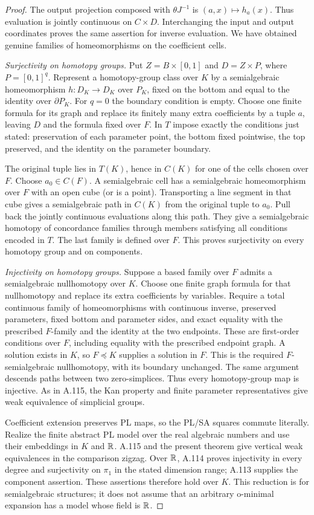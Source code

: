\begin{proof}
The output projection composed with $\theta J^{-1}$ is
$(a,x)\mapsto h_a(x)$. Thus evaluation is jointly continuous on
$C\times D$. Interchanging the input and output coordinates
proves the same assertion for inverse evaluation. We have
obtained genuine families of homeomorphisms on the coefficient
cells.

\emph{Surjectivity on homotopy groups.}
Put $Z=B\times[0,1]$ and $D=Z\times P$, where $P=[0,1]^q$.
Represent a homotopy-group class over $K$ by a semialgebraic
homeomorphism $h:D_K\to D_K$ over $P_K$, fixed on the bottom
and equal to the identity over $\partial P_K$. For $q=0$ the
boundary condition is empty. Choose one finite formula for its
graph and replace its finitely many extra coefficients by a
tuple $a$, leaving $D$ and the formula fixed over $F$. In $T$
impose exactly the conditions just stated: preservation of each
parameter point, the bottom fixed pointwise, the top preserved,
and the identity on the parameter boundary.

The original tuple lies in $T(K)$, hence in $C(K)$ for one of
the cells chosen over $F$. Choose $a_0\in C(F)$. A semialgebraic
cell has a semialgebraic homeomorphism over $F$ with an open
cube (or is a point). Transporting a line segment in that cube
gives a semialgebraic path in $C(K)$ from the original tuple to
$a_0$. Pull back the jointly continuous evaluations along this
path. They give a semialgebraic homotopy of concordance families
through members satisfying all conditions encoded in $T$.
The last family is defined over $F$. This proves surjectivity
on every homotopy group and on components.

\emph{Injectivity on homotopy groups.}
Suppose a based family over $F$ admits a semialgebraic
nullhomotopy over $K$. Choose one finite graph formula for that
nullhomotopy and replace its extra coefficients by variables.
Require a total continuous family of homeomorphisms with
continuous inverse, preserved parameters, fixed bottom and
parameter sides, and exact equality with the prescribed
$F$-family and the identity at the two endpoints. These are
first-order conditions over $F$, including equality with the
prescribed endpoint graph. A solution exists in $K$, so
$F\preccurlyeq K$ supplies a solution in $F$. This is the
required $F$-semialgebraic nullhomotopy, with its boundary
unchanged. The same argument descends paths between two
zero-simplices. Thus every homotopy-group map is injective.
As in A.115, the Kan property and finite parameter
representatives give weak equivalence of simplicial groups.

Coefficient extension preserves PL maps, so the PL/SA squares
commute literally. Realize the finite abstract PL model over
the real algebraic numbers and use their embeddings in $K$
and $\mathbb R$. A.115 and the present theorem give vertical weak
equivalences in the comparison zigzag. Over $\mathbb R$, A.114 proves
injectivity in every degree and surjectivity on $\pi_1$ in the
stated dimension range; A.113 supplies the component assertion.
These assertions therefore hold over $K$. This reduction is
for semialgebraic structures; it does not assume that an
arbitrary o-minimal expansion has a model whose field is $\mathbb R$.
\end{proof}

